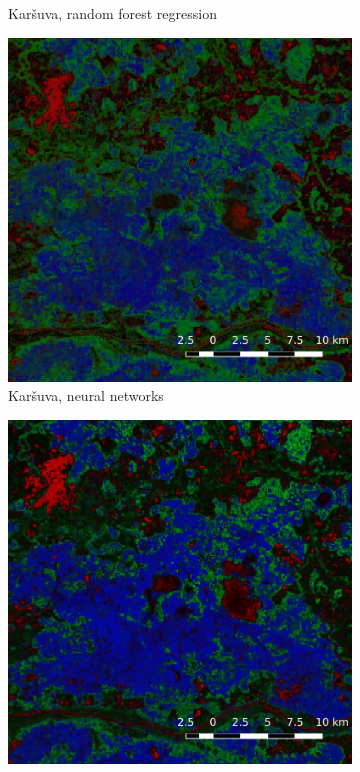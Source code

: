 \documentclass[a4paper,12pt]{scrbook}
\begin{document}
\begin{figure}
\begin{subfigure}[t]{.24\textwidth}
    \caption{Kar\v{s}uva, random forest regression}
    \label{subfig-karsuva-rf}
  \end{subfigure} \hfill
  \begin{subfigure}[t]{.24\textwidth}
    \includegraphics[width=\textwidth]{thesis-figures/figures-qgis/karsuva-nn}
    \caption{Kar\v{s}uva, neural networks}
  \end{subfigure} \hfill
  \begin{subfigure}[t]{.24\textwidth}
    \includegraphics[width=\textwidth]{thesis-figures/figures-qgis/karsuva-cm}

\end{subfigure}
\end{figure}
\end{document}
